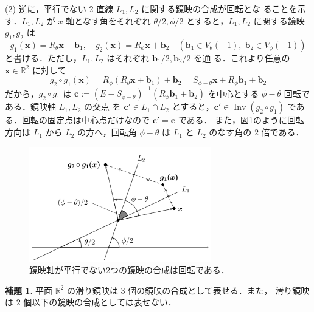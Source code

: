 \documentclass[11pt, uplatex, dvipdfmx, titlepage]{jsarticle}
\makeatletter
\DeclareMathOperator{\Inv}{Inv}
\renewenvironment{proof}[1][\proofname]{\par
  \pushQED{\qed}%
  \normalfont \topsep6\p@\@plus6\p@\relax
  \trivlist
  \item[\hskip\labelsep
         \bfseries
    {#1}]\ignorespaces
}{%
  \popQED\endtrivlist\@endpefalse
}
\theoremstyle{definition}
\newtheorem{lemma}{補題}[section]
\renewcommand{\proofname}{\textbf{証明}}
\makeatother
\begin{document}
\begin{proof}
  \noindent
  (2) 逆に，平行でない $2$ 直線 $L_1, L_2$ に関する鏡映の合成が回転とな
  ることを示す．$L_1, L_2$ が $x$ 軸となす角をそれぞれ $\theta/2,
  \phi/2$ とすると，$L_1, L_2$ に関する鏡映 $g_1, g_2$ は
  \[
    g_1(\bm{x}) = R_{\theta} \bm{x} + \bm{b}_1, \quad g_2(\bm{x}) = R_{\phi}\bm{x} + \bm{b}_2 \quad
    \left(\bm{b}_1 \in V_{\theta}(-1), \; \bm{b}_2 \in V_{\phi}(-1) \right)
  \]
  と書ける．ただし，$L_1, L_2$ はそれぞれ $\bm{b}_1/2, \bm{b}_2/2$ を通
  る．これより任意の $\bm{x} \in \mathbb{R}^2$ に対して
  \[
    g_2 \circ g_1(\bm{x}) = R_{\phi}( R_{\theta}\bm{x}+\bm{b}_1) + \bm{b}_2
    = S_{\phi-\theta} \bm{x} + R_{\phi}\bm{b}_1 +\bm{b}_2
  \]
  だから，$g_2 \circ
  g_1$ は
  $\bm{c}:=(E-S_{\phi-\theta})^{-1}\left(R_{\phi}\bm{b}_1+\bm{b}_2\right)$
  を中心とする $\phi-\theta$ 回転である．鏡映軸 $L_1, L_2$ の交点
  を $\bm{c}' \in L_1 \cap L_2$ とすると，$\bm{c}' \in \Inv(g_2 \circ
  g_1)$ である．回転の固定点は中心点だけなので $\bm{c}'=\bm{c}$ である．
  また，図\ref{fig:rotation2refgen}のように回転方向は $L_1$ から $L_2$
  の方へ，回転角 $\phi-\theta$ は $L_1$ と $L_2$ のなす角の $2$ 倍である．
  \begin{figure}[h]
    \centering
    \includegraphics[height=5cm]{pictures/rotation2refgen.pdf}   
    \caption{鏡映軸が平行でない2つの鏡映の合成は回転である．}
    \label{fig:rotation2refgen}
  \end{figure}
\end{proof}


\begin{lemma}\label{lem:glide2ref}
  平面 $\mathbb{R}^2$ の滑り鏡映は $3$ 個の鏡映の合成として表せる．また，
  滑り鏡映は $2$ 個以下の鏡映の合成としては表せない．
\end{lemma}
  
\end{document}
